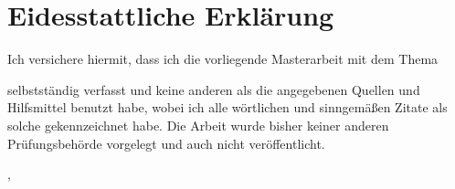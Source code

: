 \chapter*{Eidesstattliche Erklärung} %

Ich versichere hiermit, dass ich die vorliegende Masterarbeit mit dem Thema
\begin{quote}
    \textit{\titleDocument}
\end{quote}
selbstständig verfasst und keine anderen als die angegebenen Quellen und Hilfsmittel benutzt habe, wobei ich alle wörtlichen und sinngemäßen Zitate als solche gekennzeichnet habe.
Die Arbeit wurde bisher keiner anderen Prüfungsbehörde vorgelegt und auch nicht veröffentlicht.

\vspace*{2cm}

\begingroup
\setlength{\parindent}{0pt} %

\locationDocument, \dateDocument
\bigskip
\bigskip

\newlength{\widthbox}
\settowidth{\widthbox}{\locationDocument, \dateDocument}

\makebox[\widthbox]{\hrulefill}\\
\authorDocument
\endgroup